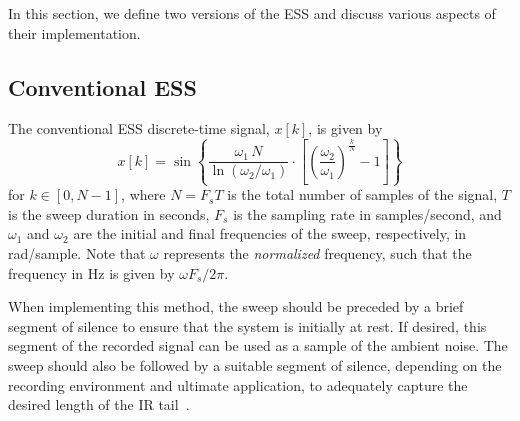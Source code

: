 In this section, we define two versions of the ESS and discuss various aspects of their implementation.

\subsection{Conventional ESS}
The conventional ESS discrete-time signal, $x[k]$, is given by \citep{Farina2007a}
\begin{equation}\label{eq:A5_Impulse_Response:ESS}
x[k] = \sin \left\{ \frac{\omega_1\,N}{\ln\left(\omega_2/\omega_1\right)} \cdot \left[\left(\frac{\omega_2}{\omega_1}\right)^{\frac{k}{N}}-1\right] \right\}
\end{equation}
for $k \in[0,N-1]$, where $N = F_s T$ is the total number of samples of the signal, $T$ is the sweep duration in seconds, $F_s$ is the sampling rate in samples/second, and $\omega_1$ and $\omega_2$ are the initial and final frequencies of the sweep, respectively, in rad/sample.
Note that $\omega$ represents the \textit{normalized} frequency, such that the frequency in Hz is given by $\omega F_s/2 \pi$.

When implementing this method, the sweep should be preceded by a brief segment of silence to ensure that the system is initially at rest.
If desired, this segment of the recorded signal can be used as a sample of the ambient noise.
The sweep should also be followed by a suitable segment of silence, depending on the recording environment and ultimate application, to adequately capture the desired length of the IR tail~\citep{Farina2007a}.

